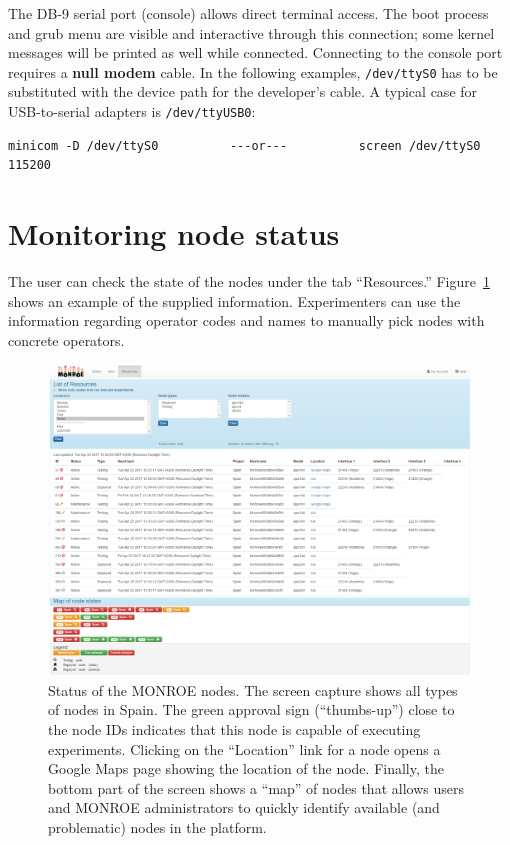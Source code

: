 \documentclass[a4paper,10pt]{article}
\newcommand{\monroe}{MONROE}
\newcommand{\identifier}[1]{{\texttt{\small{#1}}}}
\begin{document}
The DB-9 serial port (console) allows direct terminal access.
The boot process and grub menu are visible and interactive through this connection; some kernel messages will be printed as well while connected.
Connecting to the console port requires a \textbf{null modem} cable.
In the following examples, \identifier{/dev/ttyS0} has to be substituted with the device path for the developer's cable.
A typical case for USB-to-serial adapters is \identifier{/dev/ttyUSB0}:
\begin{verbatim}
minicom -D /dev/ttyS0          ---or---          screen /dev/ttyS0 115200
\end{verbatim}



\section{Monitoring node status}
\label{subsec:nodeStatus}

The user can check the state of the nodes under the tab ``Resources.'' Figure~\ref{fig:Resources} shows an example of the supplied information.
Experimenters can use the information regarding operator codes and names to manually pick nodes with concrete operators.

\begin{figure}[tp]
	\centering
	\includegraphics[width=1\textwidth]{Resources.png}
	\caption{Status of the \monroe{} nodes. The screen capture shows all types of nodes in Spain. The green approval sign (``thumbs-up'') close to the node IDs indicates that this node is capable of executing experiments. Clicking on the ``Location'' link for a node opens a Google Maps page showing the location of the node. Finally, the bottom part of the screen shows a ``map'' of nodes that allows users and \monroe{} administrators to quickly identify available (and problematic) nodes in the platform.}
	\label{fig:Resources}
\end{figure}
\end{document}
